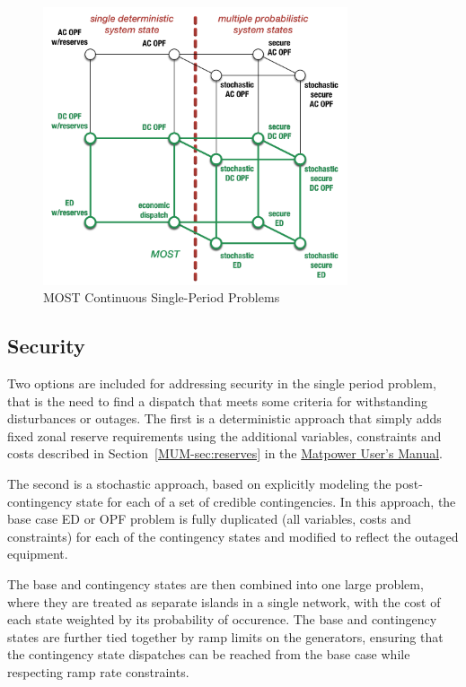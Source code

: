 \documentclass[12pt]{article}
\newcommand{\mpver}[0]{6.0}
\newcommand{\matpower}[0]{{\sc Matpower}}
\newcommand{\mumurl}[0]{http://www.pserc.cornell.edu/matpower/docs/MATPOWER-manual-\mpver.pdf}
\newcommand{\mum}[0]{\href{\mumurl}{\matpower{} User's Manual}}
\numberwithin{equation}{section}
\numberwithin{table}{section}
\numberwithin{figure}{section}
\begin{document}
\begin{figure}[hbtp]
  \centering
\includegraphics[width=0.8\textwidth]{./figures/most-single-period-problems-16}
  \caption{MOST Continuous Single-Period Problems}
  \label{fig:most_single_period}
\end{figure}

\subsection{Security}

Two options are included for addressing security in the single period problem, that is the need to find a dispatch that meets some criteria for withstanding disturbances or outages. The first is a deterministic approach that simply adds fixed zonal reserve requirements using the additional variables, constraints and costs described in Section~\ref{MUM-sec:reserves} in the \mum{}.

The second is a stochastic approach, based on explicitly modeling the post-contingency state for each of a set of credible contingencies. In this approach, the base case ED or OPF problem is fully duplicated (all variables, costs and constraints) for each of the contingency states and modified to reflect the outaged equipment.

The base and contingency states are then combined into one large problem, where they are treated as separate islands in a single network, with the cost of each state weighted by its probability of occurence. The base and contingency states are further tied together by ramp limits on the generators, ensuring that the contingency state dispatches can be reached from the base case while respecting ramp rate constraints.
\end{document}
